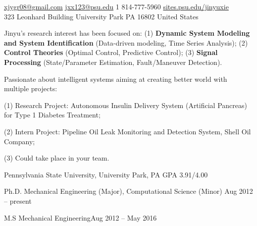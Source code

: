 \documentclass[10pt,a4paper]{article}
\begin{document}
\sloppy  %



\nobreakvspace{0.3em}  %

\noindent\href{mailto:xjygr08@gmail.com}{xjygr08@gmail.com}\sbull
\href{mailto:jxx123@psu.edu}{jxx123@psu.edu}\sbull
\textsmaller{+}1 814-777-5960\sbull
\href{http://sites.psu.edu/jinyuxie/}{sites.psu.edu/jinyuxie}
\\
323 Leonhard Building\sbull
University Park\sbull
PA 16802\sbull
United States

\spacedhrule{0.5em}{-0.8em}  %


Jinyu's research interest has been focused on: (1) \textbf{Dynamic System Modeling and System
Identification} (Data-driven modeling, Time Series Analysis); (2) \textbf{Control
Theories} (Optimal Control, Predictive Control); (3) \textbf{Signal Processing}
(State/Parameter Estimation, Fault/Maneuver Detection). \vspace{0.3em} 

\noindent Passionate about intelligent systems aiming at creating better world with
multiple projects:

(1) Research Project: Autonomous Insulin Delivery System (Artificial Pancreas) for Type
1 Diabetes Treatment;

(2) Intern Project: Pipeline Oil Leak Monitoring and Detection System, Shell Oil Company;

(3) Could take place in your team.


\spacedhrule{0.5em}{-0.8em}


\headedsection
{Pennsylvania State University, University Park, PA}
{GPA 3.91/4.00}{
  \headedsubsection
  {Ph.D. Mechanical Engineering (Major), Computational Science (Minor)}
  {Aug 2012 -- present}{}

  \headedsubsection
  {M.S Mechanical Engineering}{Aug 2012 -- May 2016}{}
}
\end{document}
